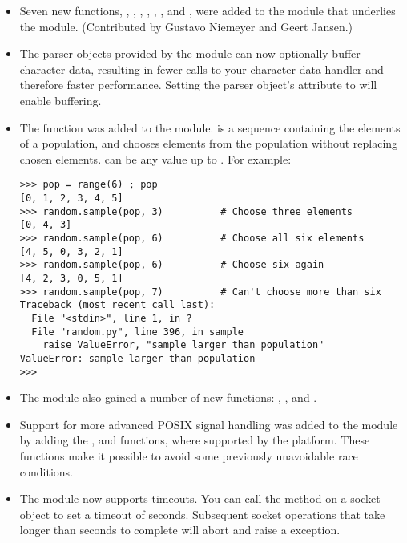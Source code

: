 \documentclass{howto}
\begin{document}
\begin{itemize}
\item Seven new functions, , ,
, , ,
, and , were added to the
 module that underlies the  module.
(Contributed by Gustavo Niemeyer and Geert Jansen.)

\item The parser objects provided by the  module
can now optionally buffer character data, resulting in fewer calls to
your character data handler and therefore faster performance.  Setting
the parser object's  attribute to 
will enable buffering.

\item The  function was
added to the  module.   is a sequence
containing the elements of a population, and 
chooses  elements from the population without replacing chosen
elements.   can be any value up to .
For example:

\begin{verbatim}
>>> pop = range(6) ; pop
[0, 1, 2, 3, 4, 5]
>>> random.sample(pop, 3)          # Choose three elements
[0, 4, 3]
>>> random.sample(pop, 6)          # Choose all six elements
[4, 5, 0, 3, 2, 1]
>>> random.sample(pop, 6)          # Choose six again
[4, 2, 3, 0, 5, 1]
>>> random.sample(pop, 7)          # Can't choose more than six
Traceback (most recent call last):
  File "<stdin>", line 1, in ?
  File "random.py", line 396, in sample
    raise ValueError, "sample larger than population"
ValueError: sample larger than population
>>>
\end{verbatim}

\item The  module also gained a number of new
functions: ,
, and .

\item Support for more advanced POSIX signal handling was added
to the  module by adding the ,
 and  functions, where supported
by the platform.  These functions make it possible to avoid some previously
unavoidable race conditions.

\item The  module now supports timeouts.  You
can call the  method on a socket object to
set a timeout of  seconds.  Subsequent socket operations that
take longer than  seconds to complete will abort and raise a
 exception.


\end{itemize}
\end{document}
